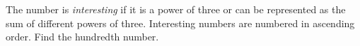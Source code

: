 \problem
The number is \emph{interesting} if it is a power of three or can be
represented as the sum of different powers of three.
Interesting numbers are numbered in ascending order.
Find the hundredth number.

\solution

\endproblem
